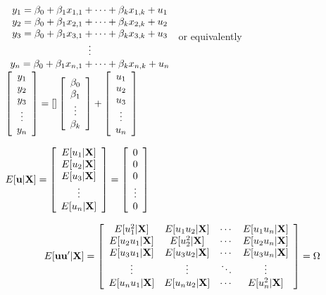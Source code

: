 \documentclass{article}%
\begin{document}
$%
\begin{array}
[c]{c}%
y_{1}=\beta_{0}+\beta_{1}x_{1,1}+\cdots+\beta_{k}x_{1,k}+u_{1}\\
y_{2}=\beta_{0}+\beta_{1}x_{2,1}+\cdots+\beta_{k}x_{2,k}+u_{2}\\
y_{3}=\beta_{0}+\beta_{1}x_{3,1}+\cdots+\beta_{k}x_{3,k}+u_{3}\\
\vdots\\
y_{n}=\beta_{0}+\beta_{1}x_{n,1}+\cdots+\beta_{k}x_{n,k}+u_{n}%
\end{array}
$ or equivalently $\left[
\begin{array}
[c]{c}%
y_{1}\\
y_{2}\\
y_{3}\\
\vdots\\
y_{n}%
\end{array}
\right]  =\left[  {}\right]  \left[
\begin{array}
[c]{c}%
\beta_{0}\\
\beta_{1}\\
\vdots\\
\beta_{k}%
\end{array}
\right]  +\left[
\begin{array}
[c]{c}%
u_{1}\\
u_{2}\\
u_{3}\\
\vdots\\
u_{n}%
\end{array}
\right]  $

\bigskip

$E[\mathbf{u}|\mathbf{X}]=\left[
\begin{array}
[c]{c}%
E[u_{1}|\mathbf{X}]\\
E[u_{2}|\mathbf{X}]\\
E[u_{3}|\mathbf{X}]\\
\vdots\\
E[u_{n}|\mathbf{X}]
\end{array}
\right]  =\left[
\begin{array}
[c]{c}%
0\\
0\\
0\\
\vdots\\
0
\end{array}
\right]  $%

\[
E[\mathbf{u}\mathbf{u}^{\prime}|\mathbf{X}]=\left[
\begin{array}
[c]{cccc}%
E[u_{1}^{2}|\mathbf{X}] & E[u_{1}u_{2}|\mathbf{X}] & \cdots & E[u_{1}%
u_{n}|\mathbf{X}]\\
E[u_{2}u_{1}|\mathbf{X}] & E[u_{2}^{2}|\mathbf{X}] & \cdots & E[u_{2}%
u_{n}|\mathbf{X}]\\
E[u_{3}u_{1}|\mathbf{X}] & E[u_{3}u_{2}|\mathbf{X}] & \cdots & E[u_{3}%
u_{n}|\mathbf{X}]\\
\vdots & \vdots & \ddots & \vdots\\
E[u_{n}u_{1}|\mathbf{X}] & E[u_{n}u_{2}|\mathbf{X}] & \cdots & E[u_{n}%
^{2}|\mathbf{X}]
\end{array}
\right]  =\Omega
\]
\end{document}
